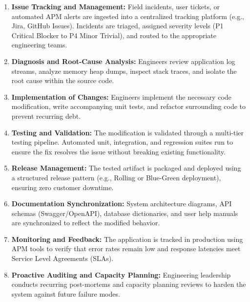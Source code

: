 \documentclass[11pt,a4paper]{article}
\begin{document}
\begin{enumerate}
    \item \textbf{Issue Tracking and Management:} Field incidents, user tickets, or automated APM alerts are ingested into a centralized tracking platform (e.g., Jira, GitHub Issues). Incidents are triaged, assigned severity levels (P1 Critical Blocker to P4 Minor Trivial), and routed to the appropriate engineering teams.
    \item \textbf{Diagnosis and Root-Cause Analysis:} Engineers review application log streams, analyze memory heap dumps, inspect stack traces, and isolate the root cause within the source code.
    \item \textbf{Implementation of Changes:} Engineers implement the necessary code modification, write accompanying unit tests, and refactor surrounding code to prevent recurring debt.
    \item \textbf{Testing and Validation:} The modification is validated through a multi-tier testing pipeline. Automated unit, integration, and regression suites run to ensure the fix resolves the issue without breaking existing functionality.
    \item \textbf{Release Management:} The tested artifact is packaged and deployed using a structured release pattern (e.g., Rolling or Blue-Green deployment), ensuring zero customer downtime.
    \item \textbf{Documentation Synchronization:} System architecture diagrams, API schemas (Swagger/OpenAPI), database dictionaries, and user help manuals are synchronized to reflect the modified behavior.
    \item \textbf{Monitoring and Feedback:} The application is tracked in production using APM tools to verify that error rates remain low and response latencies meet Service Level Agreements (SLAs).
    \item \textbf{Proactive Auditing and Capacity Planning:} Engineering leadership conducts recurring post-mortems and capacity planning reviews to harden the system against future failure modes.
\end{enumerate}
\end{document}
